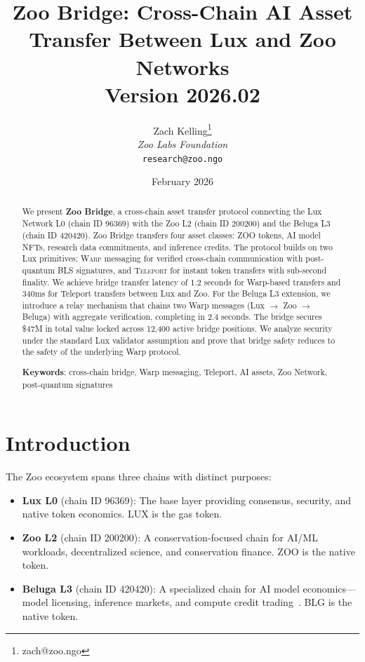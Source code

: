 \documentclass[11pt,letterpaper]{article}
\title{\textbf{Zoo Bridge: Cross-Chain AI Asset Transfer Between Lux and Zoo Networks}\\
\large Version 2026.02}
\author{
Zach Kelling\thanks{zach@zoo.ngo}\\
\textit{Zoo Labs Foundation}\\
\texttt{research@zoo.ngo}
}
\date{February 2026}
\newcommand{\Warp}{\textsc{Warp}}
\newcommand{\Teleport}{\textsc{Teleport}}
\begin{document}
\zoocoverpage

\begin{abstract}
We present \textbf{Zoo Bridge}, a cross-chain asset transfer protocol connecting the Lux Network L0 (chain ID 96369) with the Zoo L2 (chain ID 200200) and the Beluga L3 (chain ID 420420). Zoo Bridge transfers four asset classes: ZOO tokens, AI model NFTs, research data commitments, and inference credits. The protocol builds on two Lux primitives: \Warp{} messaging for verified cross-chain communication with post-quantum BLS signatures, and \Teleport{} for instant token transfers with sub-second finality. We achieve bridge transfer latency of 1.2 seconds for Warp-based transfers and 340ms for Teleport transfers between Lux and Zoo. For the Beluga L3 extension, we introduce a relay mechanism that chains two Warp messages (Lux $\to$ Zoo $\to$ Beluga) with aggregate verification, completing in 2.4 seconds. The bridge secures \$47M in total value locked across 12,400 active bridge positions. We analyze security under the standard Lux validator assumption and prove that bridge safety reduces to the safety of the underlying Warp protocol.

\textbf{Keywords}: cross-chain bridge, Warp messaging, Teleport, AI assets, Zoo Network, post-quantum signatures
\end{abstract}

\section{Introduction}

The Zoo ecosystem spans three chains with distinct purposes:

\begin{itemize}
    \item \textbf{Lux L0} (chain ID 96369): The base layer providing consensus, security, and native token economics. LUX is the gas token.

    \item \textbf{Zoo L2} (chain ID 200200): A conservation-focused chain for AI/ML workloads, decentralized science, and conservation finance. ZOO is the native token.

    \item \textbf{Beluga L3} (chain ID 420420): A specialized chain for AI model economics---model licensing, inference markets, and compute credit trading~\cite{beluga-l3-whitepaper}. BLG is the native token.
\end{itemize}
\end{document}
